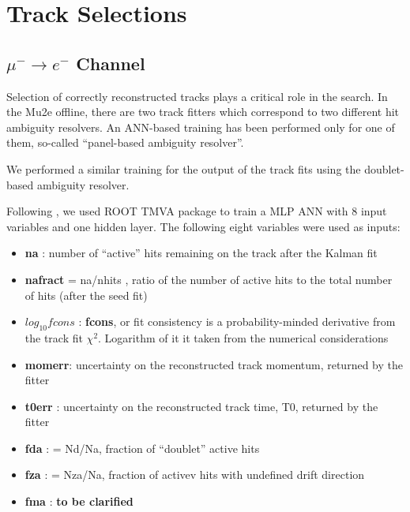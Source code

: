\section{Track Selections}

\subsection{$\mu^- \rightarrow e^-$ Channel}


Selection of correctly reconstructed tracks plays a critical role in the search.
In the Mu2e offline, there are two track fitters which correspond to two different
hit ambiguity resolvers. An ANN-based training has been performed only for one of them,
so-called ``panel-based ambiguity resolver''.

We performed a similar training for the output of the track fits using the doublet-based
ambiguity resolver.

Following \cite{MU2E_4595_ANN_TRAINING}, we used ROOT TMVA package to train a MLP ANN
with 8 input variables and one hidden layer. The following eight variables were used as inputs:

\begin{itemize}
\item
  {\bf na }: number of ``active'' hits remaining on the track after the Kalman fit
\item
  {\bf  nafract} = na/nhits , ratio of the number of active hits to the total number of hits
  (after the seed fit)
\item
  $log_{10}{fcons}$ : {\bf fcons}, or fit consistency is a probability-minded derivative
  from the track fit $\chi^2$. Logarithm of it it taken from the numerical considerations
\item
  {\bf momerr}: uncertainty on the reconstructed track momentum, returned by the fitter
\item
  {\bf t0err} : uncertainty on the reconstructed track time, T0, returned by the fitter
\item
  {\bf fda} : = Nd/Na, fraction of ``doublet'' active hits
\item
  {\bf fza } : = Nza/Na, fraction of activev hits with undefined drift direction
\item
  {\bf fma } : {\bf \red to be clarified}
\end{itemize}

